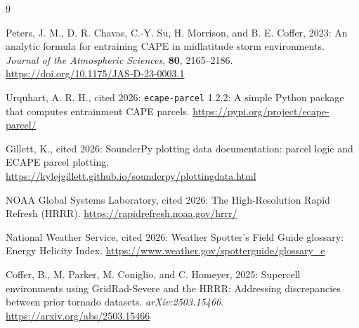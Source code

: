 \documentclass[11pt]{article}
\begin{document}
\begin{thebibliography}{9}

Peters, J. M., D. R. Chavas, C.-Y. Su, H. Morrison, and B. E. Coffer, 2023:
An analytic formula for entraining CAPE in midlatitude storm environments.
\textit{Journal of the Atmospheric Sciences}, \textbf{80}, 2165--2186.
\url{https://doi.org/10.1175/JAS-D-23-0003.1}

Urquhart, A. R. H., cited 2026:
\texttt{ecape-parcel} 1.2.2: A simple Python package that computes entrainment CAPE parcels.
\url{https://pypi.org/project/ecape-parcel/}

Gillett, K., cited 2026:
SounderPy plotting data documentation: parcel logic and ECAPE parcel plotting.
\url{https://kylejgillett.github.io/sounderpy/plottingdata.html}

NOAA Global Systems Laboratory, cited 2026:
The High-Resolution Rapid Refresh (HRRR).
\url{https://rapidrefresh.noaa.gov/hrrr/}

National Weather Service, cited 2026:
Weather Spotter's Field Guide glossary: Energy Helicity Index.
\url{https://www.weather.gov/spotterguide/glossary_e}

Coffer, B., M. Parker, M. Coniglio, and C. Homeyer, 2025:
Supercell environments using GridRad-Severe and the HRRR: Addressing discrepancies between prior tornado datasets.
\textit{arXiv:2503.15466}.
\url{https://arxiv.org/abs/2503.15466}

\end{thebibliography}
\end{document}
